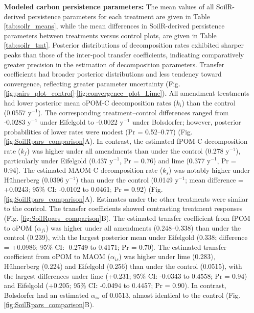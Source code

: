 \documentclass[preprint,12pt]{elsarticle}
\begin{document}
\textbf{Modeled carbon persistence parameters:}
  The mean values of all SoilR-derived persistence parameters for each treatment are given in Table \ref{tab:soilr_means}, while the mean differences in SoilR-derived persistence parameters between treatments versus control plots, are given in Table \ref{tab:soilr_tmt}.
  Posterior distributions of decomposition rates exhibited sharper peaks than those of the inter-pool transfer coefficients, indicating comparatively greater precision in the estimation of decomposition parameters. Transfer coefficients had broader posterior distributions and less tendency toward convergence, reflecting greater parameter uncertainty (Fig. \ref{fig:pairs_plot_control}-\ref{fig:convergence_plot_Lime}).
  All amendment treatments had lower posterior mean oPOM-C decomposition rates (\(k_i\)) than the control (0.0557 y$^{-1}$). The corresponding treatment–control differences ranged from -0.0283 y$^{-1}$ under Eifelgold to -0.0022 y$^{-1}$ under Bolsdorfer; however, posterior probabilities of lower rates were modest (Pr = 0.52–0.77) (Fig. \ref{fig:SoilRpars_comparison}A). In contrast, the estimated fPOM-C decomposition rate (\(k_f\)) was higher under all amendments than under the control (0.278 y$^{-1}$), particularly under Eifelgold (0.437 y$^{-1}$, Pr = 0.76) and lime (0.377 y$^{-1}$, Pr = 0.94). The estimated MAOM-C decomposition rate (\(k_s\)) was notably higher under Hühnerberg (0.0396 y$^{-1}$) than under the control (0.0149 y$^{-1}$; mean difference = +0.0243; 95\% CI: -0.0102 to 0.0461; Pr = 0.92) (Fig. \ref{fig:SoilRpars_comparison}A). Estimates under the other treatments were similar to the control.
  The transfer coefficients showed contrasting treatment responses (Fig. \ref{fig:SoilRpars_comparison}B). The estimated transfer coefficient from fPOM to oPOM (\(\alpha_{fi}\)) was higher under all amendments (0.248–0.338) than under the control (0.239), with the largest posterior mean under Eifelgold (0.338; difference = +0.0986; 95\% CI: -0.2749 to 0.4171; Pr = 0.70). The estimated transfer coefficient from oPOM to MAOM (\(\alpha_{is}\)) was higher under lime (0.283), Hühnerberg (0.224) and Eifelgold (0.256) than under the control (0.0515), with the largest differences under lime (+0.231; 95\% CI: -0.0343 to 0.4558; Pr = 0.94) and Eifelgold (+0.205; 95\% CI: -0.0494 to 0.4457; Pr = 0.90). In contrast, Bolsdorfer had an estimated \(\alpha_{is}\) of 0.0513, almost identical to the control (Fig. \ref{fig:SoilRpars_comparison}B). 
\end{document}
